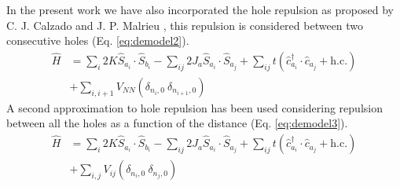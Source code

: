 \documentclass[12pt,twoside]{report}
\begin{document}
	In the present work we have also incorporated the hole repulsion as proposed
	by C. J. Calzado and J.  P. Malrieu \cite{calzado_proposal_2001}, this
	repulsion is considered between two consecutive holes (Eq.
	\ref{eq:demodel2}).
	\begin{equation}
		\begin{split}
			\hat{H} & = \sum_i 2K \hat{S}_{a_i}\cdot\hat{S}_{b_i} 
			- \sum_{ij} 2J_a \hat{S}_{a_i}\cdot\hat{S}_{a_j}
			+ \sum_{ij} t\left( \hat{c}^{\dagger}_{a_i}\cdot\hat{c}_{a_j} + \text{h.c.}\right ) \\
		&	+ \sum_{i,i+1} V_{NN}\left ( \delta_{n_i,0}\ \delta_{n_{i+1},0} \right ) 
		\end{split}
		\label{eq:demodel2}
	\end{equation}
	A second approximation to hole repulsion has been used considering repulsion
	between all the holes as a function of the distance (Eq. \ref{eq:demodel3}).
	\begin{equation}
		\begin{split}
			\hat{H} & = \sum_i 2K \hat{S}_{a_i}\cdot\hat{S}_{b_i} 
			- \sum_{ij} 2J_a \hat{S}_{a_i}\cdot\hat{S}_{a_j}
			+ \sum_{ij} t\left( \hat{c}^{\dagger}_{a_i}\cdot\hat{c}_{a_j} + \text{h.c.}\right ) \\
		&	+ \sum_{i,j} V_{ij}\left ( \delta_{n_i,0}\ \delta_{n_{j},0} \right )
		\end{split}
		\label{eq:demodel3}
	\end{equation}
	
	
	
\end{document}
